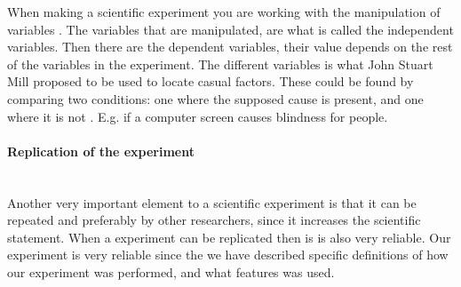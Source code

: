 When making a scientific experiment you are working with the manipulation of variables \citep[page 21]{Design}. The variables that are manipulated, are what is called the independent variables. Then there are the dependent variables, their value depends on the rest of the variables in the experiment\citep[page 21]{Design}. The different variables is what John Stuart Mill proposed to be used to locate casual factors. These could be found by comparing two conditions: one where the supposed cause is present, and one where it is not \citep[page 20]{Design}. E.g. if a computer screen causes blindness for people.

\paragraph{Replication of the experiment}\hspace{0pt}\\
Another very important element to a scientific experiment is that it can be repeated and preferably by other researchers, since it increases the scientific statement\citep[page 26]{Design}. When a experiment can be replicated then is is also very reliable. 
Our experiment is very reliable since the we have described specific definitions of how our experiment was performed, and what features was used.
